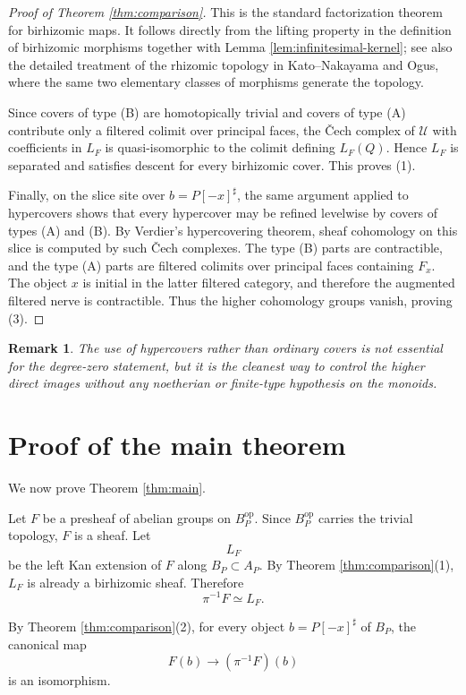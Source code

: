 \documentclass{article}
\newtheorem{remark}[theorem]{Remark}
\theoremstyle{definition}
\begin{document}
\begin{proof}[Proof of Theorem \ref{thm:comparison}]
This is the standard factorization theorem for birhizomic maps.  It follows directly from the lifting property in the definition of birhizomic morphisms together with Lemma \ref{lem:infinitesimal-kernel}; see also the detailed treatment of the rhizomic topology in Kato--Nakayama and Ogus, where the same two elementary classes of morphisms generate the topology.

Since covers of type (B) are homotopically trivial and covers of type (A) contribute only a filtered colimit over principal faces, the Čech complex of \(\mathcal U\) with coefficients in \(L_F\) is quasi-isomorphic to the colimit defining \(L_F(Q)\).  Hence \(L_F\) is separated and satisfies descent for every birhizomic cover.  This proves (1).

Finally, on the slice site over \(b=P[-x]^\sharp\), the same argument applied to hypercovers shows that every hypercover may be refined levelwise by covers of types (A) and (B).  By Verdier's hypercovering theorem, sheaf cohomology on this slice is computed by such Čech complexes.  The type (B) parts are contractible, and the type (A) parts are filtered colimits over principal faces containing \(F_x\).  The object \(x\) is initial in the latter filtered category, and therefore the augmented filtered nerve is contractible.  Thus the higher cohomology groups vanish, proving (3).
\end{proof}

\begin{remark}
The use of hypercovers rather than ordinary covers is not essential for the degree-zero statement, but it is the cleanest way to control the higher direct images without any noetherian or finite-type hypothesis on the monoids.
\end{remark}

\section{Proof of the main theorem}

We now prove Theorem \ref{thm:main}.

Let \(F\) be a presheaf of abelian groups on \(B_P^{\mathrm{op}}\).  Since \(B_P^{\mathrm{op}}\) carries the trivial topology, \(F\) is a sheaf.  Let
\[
L_F
\]
be the left Kan extension of \(F\) along \(B_P\subset A_P\).  By Theorem \ref{thm:comparison}(1), \(L_F\) is already a birhizomic sheaf.  Therefore
\[
\pi^{-1}F\simeq L_F.
\]

By Theorem \ref{thm:comparison}(2), for every object \(b=P[-x]^\sharp\) of \(B_P\), the canonical map
\[
F(b)\longrightarrow (\pi^{-1}F)(b)
\]
is an isomorphism.
\end{document}
